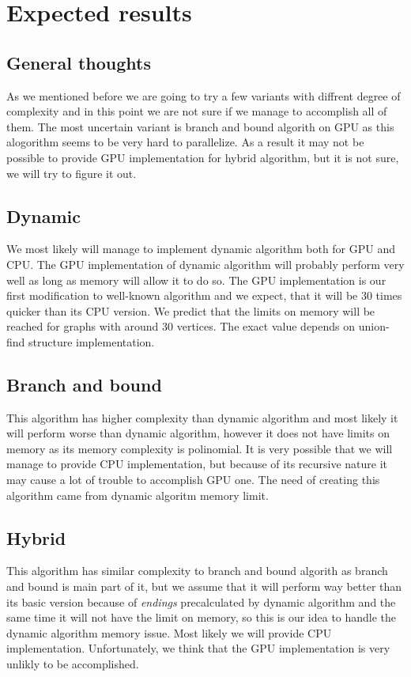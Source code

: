 \section{Expected results}
\subsection{General thoughts}
As we mentioned before we are going to try a few variants with diffrent degree of complexity and in this point we are not sure if we manage to accomplish all of them. The most uncertain variant is branch and bound algorith on GPU as this alogorithm seems to be very hard to parallelize. As a result it may not be possible to provide GPU implementation for hybrid algorithm, but it is not sure, we will try to figure it out.\\
\subsection{Dynamic}
We most likely will manage to implement dynamic algorithm both for GPU and CPU. The GPU implementation of dynamic algorithm will probably perform very well as long as memory will allow it to do so. The GPU implementation is our first modification to well-known algorithm and we expect, that it will be 30 times quicker than its CPU version. We predict that the limits on memory will be reached for graphs with around 30 vertices. The exact value depends on union-find structure implementation.\\

\subsection{Branch and bound}
This algorithm has higher complexity than dynamic algorithm and most likely it will perform worse than dynamic algorithm, however it does not have limits on memory as its memory complexity is polinomial. It is very possible that we will manage to provide CPU implementation, but because of its recursive nature it may cause a lot of trouble to accomplish GPU one. The need of creating this algorithm came from dynamic algoritm memory limit.\\


\subsection{Hybrid}
This algorithm has similar complexity to branch and bound algorith as branch and bound is main part of it, but we assume that it will perform way better than its basic version because of
\emph{endings} %
precalculated by dynamic algorithm and the same time it will not have the limit on memory, so this is our idea to handle the dynamic algorithm memory issue. Most likely we will provide CPU implementation. Unfortunately, we think that the GPU implementation is very unlikly to be accomplished.
